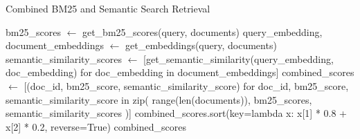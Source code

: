 \begin{algorithm}[H]
\caption{Combined BM25 and Semantic Search Retrieval}
\label{alg:combined_retrieval}
\begin{algorithmic}[1]

\State  bm25\_scores $\gets$ get\_bm25\_scores(query, documents) 
\State query\_embedding, document\_embeddings $\gets$ get\_embeddings(query, documents)
\State semantic\_similarity\_scores $\gets$ [get\_semantic\_similarity(query\_embedding, doc\_embedding) for doc\_embedding in document\_embeddings]
\State combined\_scores $\gets$ [(doc\_id, bm25\_score, semantic\_similarity\_score) 
                                 for doc\_id, bm25\_score, semantic\_similarity\_score in zip(
                                     range(len(documents)), bm25\_scores, semantic\_similarity\_scores
                                 )]
\State combined\_scores.sort(key=lambda x: x[1] * 0.8 + x[2] * 0.2, reverse=True)  
\State \Return combined\_scores 
\end{algorithmic}
\end{algorithm}
